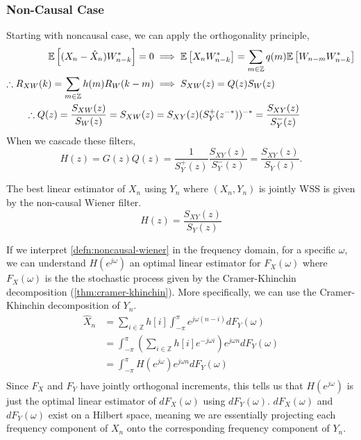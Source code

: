 \subsubsection{Non-Causal Case}
Starting with noncausal case, we can apply the orthogonality principle,
\begin{align*}
	\mathbb{E}\left[(X_n-\hat{X}_n)W_{n-k}^*\right] = 0 &\implies \mathbb{E}\left[X_nW^*_{n-k}\right] = \sum_{m\in\mathbb{Z}}q(m)\mathbb{E}\left[W_{n-m}W^*_{n-k}\right]\\
	\therefore R_{XW}(k) = \sum_{m\in\mathbb{Z}}h(m)R_W(k-m) &\implies S_{XW}(z) = Q(z)S_W(z)\\
	\therefore Q(z) = \frac{S_{XW}(z)}{S_W(z)} = S_{XW}(z) &= S_{XY}(z)(S_Y^+(z^{-*}))^{-*} = \frac{S_{XY}(z)}{S_Y^-(z)}
\end{align*}
When we cascade these filters, \[
	H(z) = G(z)Q(z) = \frac{1}{S_Y^+(z)}\frac{S_{XY}(z)}{S_Y^-(z)} = \frac{S_{XY}(z)}{S_Y(z)}.
\]
\begin{definition}
	The best linear estimator of $X_n$ using $Y_n$ where $(X_n, Y_n)$ is jointly WSS is given by the non-causal Wiener filter.
	\[
		H(z) = \frac{S_{XY}(z)}{S_Y(z)}
	\]
	\label{defn:noncausal-wiener}
\end{definition}
If we interpret \cref{defn:noncausal-wiener} in the frequency domain, for a specific $\omega$, we can understand $H(e^{j\omega})$ an optimal linear estimator for $F_X(\omega)$ where $F_X(\omega)$ is the the stochastic process given by the Cramer-Khinchin decomposition (\cref{thm:cramer-khinchin}).
More specifically, we can use the Cramer-Khinchin decomposition of $Y_n$.
\begin{align*}
	\hat{X}_n &= \sum_{i\in\mathbb{Z}}h[i]\int_{-\pi}^\pi e^{j\omega(n-i)}dF_Y(\omega)\\
	&= \int_{-\pi}^{\pi}\left(\sum_{i\in\mathbb{Z}}h[i]e^{-j\omega i}\right)e^{j\omega n}dF_Y(\omega) \\
	&= \int_{-\pi}^\pi H(e^{j\omega})e^{j\omega n}dF_Y(\omega)\\
\end{align*}
Since $F_X$ and $F_Y$ have jointly orthogonal increments, this tells us that $H(e^{j\omega})$ is just the optimal linear estimator of $dF_X(\omega)$ using $dF_Y(\omega)$.
$dF_X(\omega)$ and $dF_Y(\omega)$ exist on a Hilbert space, meaning we are essentially projecting each frequency component of $X_n$ onto the corresponding frequency component of $Y_n$.
